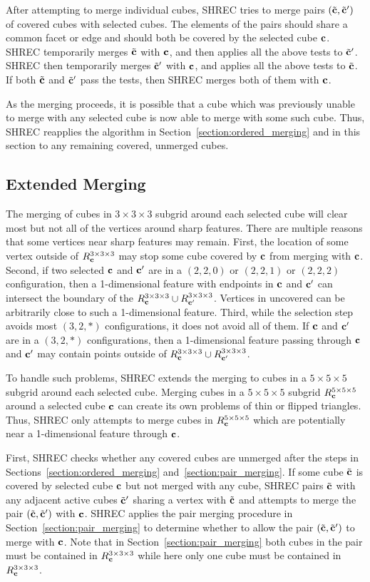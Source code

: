 After attempting to merge individual cubes,
SHREC tries to merge pairs $({\tilde{\mathbf{c}}},{\tilde{\mathbf{c}}}')$ of covered cubes with selected cubes.
The elements of the pairs should share a common facet or edge
and should both be covered by the selected cube $\mathbf{c}$.
SHREC temporarily merges ${\tilde{\mathbf{c}}}$ with $\mathbf{c}$,
and then applies all the above tests to ${\tilde{\mathbf{c}}}'$.
SHREC then temporarily merges ${\tilde{\mathbf{c}}}'$ with $\mathbf{c}$,
and applies all the above tests to ${\tilde{\mathbf{c}}}$.
If both ${\tilde{\mathbf{c}}}$ and ${\tilde{\mathbf{c}}}'$ pass the tests,
then SHREC merges both of them with $\mathbf{c}$.

As the merging proceeds,
it is possible that a cube which was previously unable 
to merge with any selected cube
is now able to merge with some such cube.
Thus, SHREC reapplies the algorithm in Section~\ref{section:ordered_merging}
and in this section to any remaining covered, unmerged cubes.


\subsection{Extended Merging}
\label{section:extended_merging}

The merging of cubes in $3 \times 3 \times 3$ subgrid
around each selected cube will clear most but not all of the vertices 
around sharp features.
There are multiple reasons that some vertices 
near sharp features may remain.
First, the location of some vertex outside of $R^{3 \times 3 \times 3}_{\mathbf{c}}$
may stop some cube covered by $\mathbf{c}$ from merging with $\mathbf{c}$.
Second, if two selected $\mathbf{c}$ and $\mathbf{c}'$ are 
in a $(2,2,0)$ or $(2,2,1)$ or $(2,2,2)$ configuration, 
then a 1-dimensional feature with endpoints in $\mathbf{c}$ and $\mathbf{c}'$ can intersect
the boundary of the $R^{3 \times 3 \times 3}_{\mathbf{c}} \cup R^{3 \times 3 \times 3}_{\mathbf{c}'}$.
Vertices in uncovered can be arbitrarily close to such a 1-dimensional feature.
Third, while the selection step avoids most $(3,2,*)$ configurations,
it does not avoid all of them.
If $\mathbf{c}$ and $\mathbf{c}'$ are in a $(3,2,*)$ configurations,
then a 1-dimensional feature passing through $\mathbf{c}$ and $\mathbf{c}'$ 
may contain points outside of $R^{3 \times 3 \times 3}_{\mathbf{c}} \cup R^{3 \times 3 \times 3}_{\mathbf{c}'}$.

To handle such problems, SHREC extends the merging to cubes
in a $5 \times 5 \times 5$ subgrid around each selected cube.
Merging cubes in a $5 \times 5 \times 5$ subgrid $R^{5 \times 5 \times 5}_{\mathbf{c}}$
around a selected cube $\mathbf{c}$ can create its own problems 
of thin or flipped triangles.
Thus, SHREC only attempts to merge cubes in $R^{5 \times 5 \times 5}_{\mathbf{c}}$
which are potentially near a 1-dimensional feature through $\mathbf{c}$.

First, SHREC checks whether any covered cubes are unmerged
after the steps in Sections~\ref{section:ordered_merging}
and~\ref{section:pair_merging}.
If some cube ${\tilde{\mathbf{c}}}$ is covered by selected cube $\mathbf{c}$
but not merged with any cube,
SHREC pairs ${\tilde{\mathbf{c}}}$ with any adjacent active cubes ${\tilde{\mathbf{c}}}'$
sharing a vertex with ${\tilde{\mathbf{c}}}$
and attempts to merge the pair $({\tilde{\mathbf{c}}},{\tilde{\mathbf{c}}}')$ with $\mathbf{c}$.
SHREC applies the pair merging procedure
in Section~\ref{section:pair_merging} to determine whether
to allow the pair $({\tilde{\mathbf{c}}},{\tilde{\mathbf{c}}}')$ to merge with $\mathbf{c}$.
Note that in Section~\ref{section:pair_merging} both cubes in the pair
must be contained in $R^{3 \times 3 \times 3}_{\mathbf{c}}$ while here only one cube
must be contained in $R^{3 \times 3 \times 3}_{\mathbf{c}}$.

